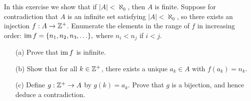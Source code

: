 \documentclass{article}
\begin{document}
\begin{exercise}
In this exercise we show that if $|A| < \aleph_0$, then $A$ is finite. Suppose for contradiction that $A$ is an infinite set satisfying $|A| < \aleph_0$, so there exists an injection $f: A\to\mathbb Z^+$. Enumerate the elements in the range of $f$ in increasing order: $\operatorname{im} f = \{n_1, n_2,n_3,\ldots\},$ where $n_i<n_j$ if $i<j$.
\begin{itemize}
    \item[(a)] Prove that $\operatorname{im} f$ is infinite.
    \item[(b)] Show that for all $k\in\mathbb Z^+$, there exists a unique $a_k\in A$ with $f(a_k) = n_k$.
    \item[(c)] Define $g: \mathbb Z^+\to A$ by $g(k) = a_k$. Prove that $g$ is a bijection, and hence deduce a contradiction.
\end{itemize}
\end{exercise}
\end{document}
